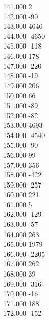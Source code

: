 { 141.000	2 \\
 142.000	-90 \\
 143.000	4646 \\
 144.000	-4650 \\
 145.000	-118 \\
 146.000	178 \\
 147.000	-220 \\
 148.000	-19 \\
 149.000	206 \\
 150.000	66 \\
 151.000	-89 \\
 152.000	-82 \\
 153.000	4693 \\
 154.000	-4540 \\
 155.000	-90 \\
 156.000	99 \\
 157.000	356 \\
 158.000	-422 \\
 159.000	-257 \\
 160.000	221 \\
 161.000	5 \\
 162.000	-129 \\
 163.000	-57 \\
 164.000	263 \\
 165.000	1979 \\
 166.000	-2205 \\
 167.000	262 \\
 168.000	39 \\
 169.000	-316 \\
 170.000	-16 \\
 171.000	188 \\
 172.000	-152 \\
}
